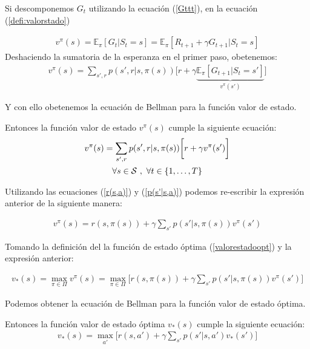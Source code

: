 Si descomponemos $G_t$ utilizando la ecuación (\ref{Gttt}), en la ecuación (\ref{defi:valorstado})

\begin{gather}
    v^\pi(s) = \mathbb{E}_\pi[G_t|S_t = s] = \mathbb{E}_\pi[R_{t+1} + \gamma G_{t+1}|S_t = s]
\end{gather}
Deshaciendo la sumatoria de la esperanza en el primer paso, obetenemos:
\begin{gather}
    v^\pi(s) = \sum_{s',r} p(s',r|s,\pi(s)) \big[r + \gamma \underbrace{\mathbb{E}_\pi[G_{t+1}|S_t = s']}_{v^\pi(s')}\big]
\end{gather}

Y con ello obetenemos la ecuación de Bellman para la función valor de estado.

\begin{cor}
    Entonces la función valor de estado $v^\pi(s)$ cumple la siguiente ecuación:
    \begin{gather}\label{BellmanEquation}
        v^\pi(s) =  \sum_{s',r}p(s',r|s,\pi(s))\bigg[r + \gamma v^\pi(s')\bigg] \\
        \forall s \in \mathcal{S} \ , \ \forall t \in \{1,\dots,T\} \notag
    \end{gather}
\end{cor}

Utilizando las ecuaciones (\ref{r(s,a)}) y (\ref{p(s'|s,a)}) podemos re-escribir la expresión anterior de la siguiente manera:

\begin{gather}\label{BellmanEquation}
    v^\pi(s) =  r(s,\pi(s)) + \gamma \sum_{s'}p(s'|s,\pi(s)) v^\pi(s')
\end{gather}

Tomando la definición del la función de estado óptima (\ref{valorestadoopt}) y la expresión anterior:

\begin{gather}
    v_*(s) = \max_{\pi \in \Pi } v^\pi(s) = \max_{\pi \in \Pi } \bigg[ r(s,\pi(s)) + \gamma \sum_{s'}p(s'|s,\pi(s)) v^\pi(s') \bigg]
\end{gather}

Podemos obtener la ecuación de Bellman para la función valor de estado óptima.
\begin{cor}
    Entonces la función valor de estado óptima $v_*(s)$ cumple la siguiente ecuación:
    \begin{gather}\label{BellmanEquationOptimo}
        v_*(s) = \max_{a'} \bigg[ r(s,a') + \gamma \sum_{s'}p(s'|s,a') v_*(s') \bigg]
    \end{gather}
\end{cor}


